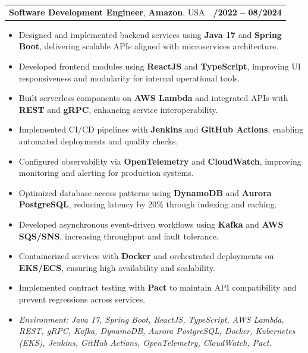\documentclass[letterpaper,11pt]{article}
\makeatletter
\newcommand{\resumeItem}[1]{
  \item\footnotesize{
    {#1 \vspace{-2pt}}
  }
}
\newcommand{\resumeSubheading}[4]{
  \vspace{-2pt}\item
    \begin{tabular*}{1.0\textwidth}[t]{l@{\extracolsep{\fill}}r}
      \textbf{\fontsize{10pt}{14pt}\selectfont #3}, \textbf{\fontsize{10pt}{14pt}\selectfont #1}, \fontsize{10pt}{14pt}\selectfont #4 & \textbf{\fontsize{10pt}{14pt}\selectfont #2} \\
    \end{tabular*}\vspace{-7pt}
}
\newcommand{\resumeItemListStart}{\begin{itemize}[leftmargin=*]}
\newcommand{\resumeItemListEnd}{\end{itemize}\vspace{-5pt}}
\makeatother
\begin{document}
\resumeSubheading
{Amazon}{10/2022 -- 08/2024}
{Software Development Engineer}{USA}
\resumeItemListStart
  \resumeItem{Designed and implemented backend services using \textbf{Java 17} and \textbf{Spring Boot}, delivering scalable APIs aligned with microservices architecture.}
  \resumeItem{Developed frontend modules using \textbf{ReactJS} and \textbf{TypeScript}, improving UI responsiveness and modularity for internal operational tools.}
  \resumeItem{Built serverless components on \textbf{AWS Lambda} and integrated APIs with \textbf{REST} and \textbf{gRPC}, enhancing service interoperability.}
  \resumeItem{Implemented CI/CD pipelines with \textbf{Jenkins} and \textbf{GitHub Actions}, enabling automated deployments and quality checks.}
  \resumeItem{Configured observability via \textbf{OpenTelemetry} and \textbf{CloudWatch}, improving monitoring and alerting for production systems.}
  \resumeItem{Optimized database access patterns using \textbf{DynamoDB} and \textbf{Aurora PostgreSQL}, reducing latency by 20\% through indexing and caching.}
  \resumeItem{Developed asynchronous event-driven workflows using \textbf{Kafka} and \textbf{AWS SQS/SNS}, increasing throughput and fault tolerance.}
  \resumeItem{Containerized services with \textbf{Docker} and orchestrated deployments on \textbf{EKS/ECS}, ensuring high availability and scalability.}
  \resumeItem{Implemented contract testing with \textbf{Pact} to maintain API compatibility and prevent regressions across services.}
  \resumeItem{\textit{Environment: Java 17, Spring Boot, ReactJS, TypeScript, AWS Lambda, REST, gRPC, Kafka, DynamoDB, Aurora PostgreSQL, Docker, Kubernetes (EKS), Jenkins, GitHub Actions, OpenTelemetry, CloudWatch, Pact.}}
\resumeItemListEnd
\end{document}
